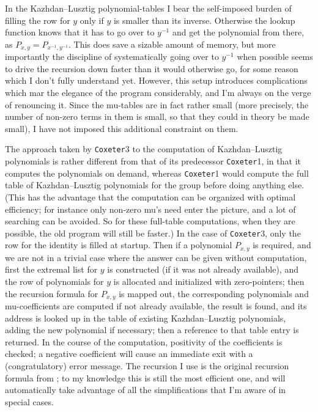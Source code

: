 \documentclass[11pt]{article}
\newcommand{\coxeter}{{\tt Coxeter}}
\newcommand{\klpol}{Kazh\-dan--Lusz\-tig po\-ly\-no\-mial}
\begin{document}
In the \klpol-tables I bear the self-imposed burden of filling the row
for $y$ only if $y$ is smaller than its inverse. Otherwise the lookup
function knows that it has to go over to $y^{-1}$ and get the polynomial
from there, as $P_{x,y}=P_{x^{-1},y^{-1}}$. This does save a sizable amount
of memory, but more importantly the discipline of systematically going over
to $y^{-1}$ when possible seems to drive the recursion down faster than it
would otherwise go, for some reason which I don't fully understand yet.
However, this setup introduces
complications which mar the elegance of the program considerably, and I'm
always on the verge of renouncing it. Since the mu-tables are in fact
rather small (more precisely, the number of non-zero terms in them is small,
so that they could in theory be made small), I have not imposed this
additional constraint on them.

The approach taken by \coxeter3 to the computation of \klpol s is rather
different from that of its predecessor \coxeter1, in that it computes
the polynomials on demand, whereas \coxeter1 would compute the full table
of \klpol s for the group before doing anything else. (This has the advantage
that the computation can be organized with optimal efficiency; for instance
only non-zero mu's need enter the picture, and a lot of searching can be
avoided. So for these full-table computations, when they are possible, the old
program will still be faster.) In the case of \coxeter3, only the row for
the identity is filled at startup. Then if a polynomial $P_{x,y}$ is required,
and we are not in a trivial case where the answer can be given without
computation, first the extremal list for $y$ is constructed (if it was not
already available), and the row of polynomials for $y$ is allocated and
initialized with zero-pointers; then the recursion formula for $P_{x,y}$ is
mapped out, the corresponding polynomials and mu-coefficients are computed
if not already available, the result is found, and its address is looked up
in the table of existing \klpol s, adding the new polynomial if necessary;
then a reference to that table entry is returned. In the course of the
computation, positivity of the coefficients is checked; a negative coefficient
will cause an immediate exit with a (congratulatory) error message. The
recursion I use is the original recursion formula from \cite{kl:1979}; to my
knowledge this is still the most efficient one, and will automatically take
advantage of all the simplifications that I'm aware of in special cases.
\end{document}
